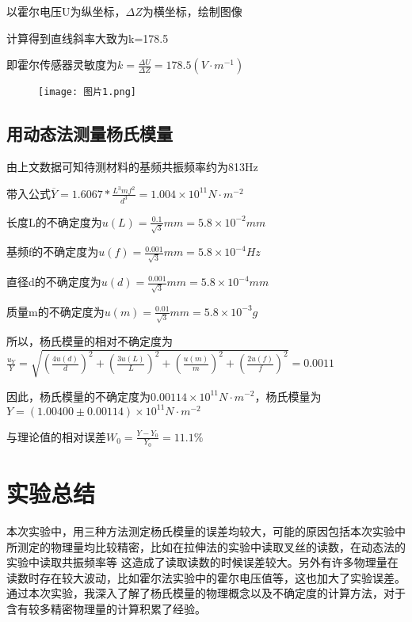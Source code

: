 \documentclass[12pt,a4paper]{article}
\begin{document}
        以霍尔电压U为纵坐标，$\Delta Z$为横坐标，绘制图像
        
        计算得到直线斜率大致为k=178.5\par
        即霍尔传感器灵敏度为$k = \frac{{\Delta U}}{{\Delta Z}} = 178.5\left( {V \cdot {m^{ - 1}}} \right)$

        \begin{figure}[H]
            \centering
            \texttt{[image: 图片1.png]}
        \end{figure}
\subsection{用动态法测量杨氏模量}
        由上文数据可知待测材料的基频共振频率约为813Hz\par
        带入公式$\overline Y  = 1.6067*\frac{{L^3}m{f^2}}{{d^3}} = 1.004 \times {10^{11}}N \cdot {m^{ - 2}}$\par

        长度L的不确定度为$u\left( L \right) = \frac{{0.1}}{{\sqrt 3 }}mm = 5.8 \times {10^{ - 2}}mm$\par
        基频f的不确定度为$u\left( f \right) = \frac{{0.001}}{{\sqrt 3 }}mm = 5.8 \times {10^{ - 4}}Hz$\par
        直径d的不确定度为$u\left( d \right) = \frac{{0.001}}{{\sqrt 3 }}mm = 5.8 \times {10^{ - 4}}mm$\par
        质量m的不确定度为$u\left( m \right) = \frac{{0.01}}{{\sqrt 3 }}mm = 5.8 \times {10^{ - 3}}g$\par
        所以，杨氏模量的相对不确定度为$\frac{{{u_Y}}}{Y} = \sqrt {{{\left( {\frac{{4u\left( d \right)}}{d}} \right)}^2} + {{\left( {\frac{{3u\left( L \right)}}{L}} \right)}^2} + {{\left( {\frac{{u\left( m \right)}}{m}} \right)}^2} + {{\left( {\frac{{2u\left( {f} \right)}}{{f}}} \right)}^2}}  = 0.0011$\par
        因此，杨氏模量的不确定度为$0.00114 \times {10^{ 11}}N \cdot {m^{ - 2}}$，杨氏模量为$Y = \left( {1.00400 \pm 0.00114} \right) \times {10^{ 11}}N \cdot {m^{ - 2}}$\par

        与理论值的相对误差${W_0} = \frac{{Y - {Y_0}}}{{{Y_0}}} = 11.1\% $


\section{实验总结}
    本次实验中，用三种方法测定杨氏模量的误差均较大，可能的原因包括本次实验中所测定的物理量均比较精密，比如在拉伸法的实验中读取叉丝的读数，在动态法的实验中读取共振频率等
    这造成了读取读数的时候误差较大。另外有许多物理量在读数时存在较大波动，比如霍尔法实验中的霍尔电压值等，这也加大了实验误差。
    通过本次实验，我深入了解了杨氏模量的物理概念以及不确定度的计算方法，对于含有较多精密物理量的计算积累了经验。
\end{document}
